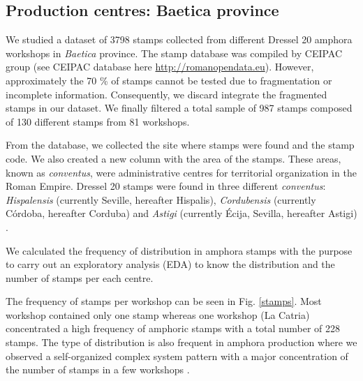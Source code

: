 \documentclass[review]{elsarticle}
\begin{document}
\subsection{Production centres: Baetica province}

We studied a dataset of 3798 stamps collected from different Dressel 20 amphora workshops in \textit{Baetica} province. The stamp database was compiled by CEIPAC group \citep{remesal_centro_2015} (see CEIPAC database here \url{http://romanopendata.eu}). However, approximately the 70 \% of stamps cannot be tested due to fragmentation or incomplete information. Consequently, we discard integrate the fragmented stamps in our dataset. We finally filtered a total sample of 987 stamps composed of 130 different stamps from 81 workshops. 



From the database, we collected the site where stamps were found and the stamp code. We also created a new column with the area of the stamps. These areas, known as \textit{conventus}, were administrative centres for territorial organization in the Roman Empire. Dressel 20 stamps were found in three different \textit{conventus}: \textit{Hispalensis} (currently Seville, hereafter Hispalis), \textit{Cordubensis} (currently C\'ordoba, hereafter Corduba) and \textit{Astigi} (currently Écija, Sevilla, hereafter Astigi) \citep{rodriguez_economioleicola_1977,
chicdatos2001,berni_millet_epigrafianforica_2008} .

We calculated the frequency of distribution in amphora stamps with the purpose to carry out an exploratory analysis (EDA) to know the distribution and the number of stamps per each centre.  

The frequency of stamps per workshop can be seen in Fig. \ref{stamps}. Most 
workshop contained only one stamp whereas one workshop (La Catria) concentrated a high frequency of amphoric stamps with a total number of 228 stamps. The type of distribution is also frequent in amphora production where we observed a self-organized complex system pattern with a major concentration of the number of stamps in a few workshops \citep{bayesian_2018,coto-sarmiento_identifying_2018}.

\end{document}
